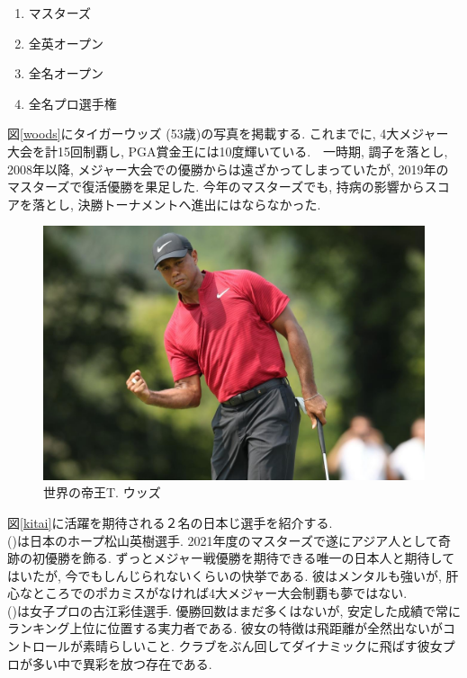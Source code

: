 \documentclass[a4j, twocolumn]{jarticle}
\begin{document}
\begin{enumerate}
  \item マスターズ
  \item 全英オープン
  \item 全名オープン
  \item 全名プロ選手権
\end{enumerate}
図\ref{woods}にタイガーウッズ (53歳)の写真を掲載する. これまでに, 4大メジャー大会を計15回制覇し, PGA賞金王には10度輝いている.　一時期, 調子を落とし, 2008年以降, メジャー大会での優勝からは遠ざかってしまっていたが, 2019年のマスターズで復活優勝を果足した. 今年のマスターズでも, 持病の影響からスコアを落とし, 決勝トーナメントへ進出にはならなかった.
\begin{figure}[htb]
  \begin{center}
    \includegraphics[width=0.5\linewidth]{tiger.jpg}
    \caption{世界の帝王T. ウッズ}
  \end{center}
\end{figure}\label{woods}
\vspace{-1.5em}
図\ref{kitai}に活躍を期待される２名の日本じ選手を紹介する.\\
\indent()は日本のホープ松山英樹選手. 2021年度のマスターズで遂にアジア人として奇跡の初優勝を飾る. ずっとメジャー戦優勝を期待できる唯一の日本人と期待してはいたが, 今でもしんじられないくらいの快挙である. 彼はメンタルも強いが, 肝心なところでのポカミスがなければ4大メジャー大会制覇も夢ではない.\\
\indent()は女子プロの古江彩佳選手. 優勝回数はまだ多くはないが, 安定した成績で常にランキング上位に位置する実力者である. 彼女の特徴は飛距離が全然出ないがコントロールが素晴らしいこと. クラブをぶん回してダイナミックに飛ばす彼女プロが多い中で異彩を放つ存在である.
\end{document}
